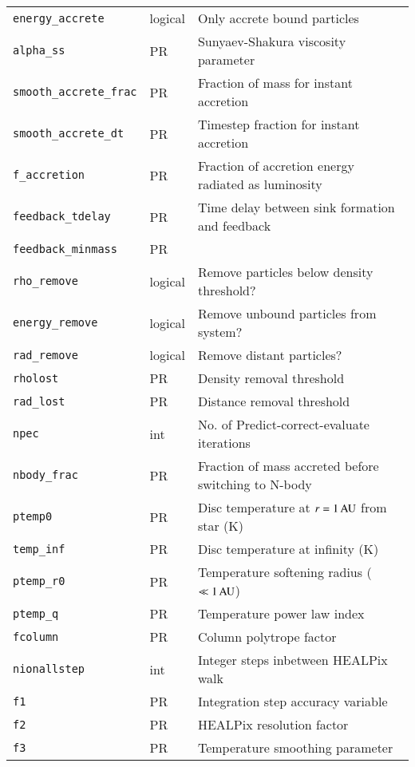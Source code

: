 \documentclass[a4paper]{article}
\newcommand{\var}[1]{\texttt{#1}}
\begin{document}
\begin{center}
\begin{supertabular}{|p{3cm}|p{2cm}|p{8cm}|}
\var{energy\_accrete} & logical & Only accrete bound particles \\
\var{alpha\_ss}       & PR       & Sunyaev-Shakura viscosity parameter \\
\var{smooth\_accrete\_frac} & PR & Fraction of mass for instant accretion \\
\var{smooth\_accrete\_dt}   & PR & Timestep fraction for instant accretion \\
\var{f\_accretion}    & PR      & Fraction of accretion energy radiated as luminosity \\
\var{feedback\_tdelay} & PR     & Time delay between sink formation and feedback\\
\var{feedback\_minmass} & PR    & \\ \hline
\var{rho\_remove}    & logical  & Remove particles below density threshold? \\
\var{energy\_remove} & logical  & Remove unbound particles from system? \\
\var{rad\_remove}    & logical  & Remove distant particles? \\
\var{rholost}        & PR       & Density removal threshold \\
\var{rad\_lost}      & PR       & Distance removal threshold \\ \hline
\var{npec}           & int      & No. of Predict-correct-evaluate iterations \\
\var{nbody\_frac}    & PR       & Fraction of mass accreted before switching to N-body \\ \hline
\var{ptemp0}         & PR       & Disc temperature at $r = 1\,{\rm AU}$ from star (K) \\
\var{temp\_inf}      & PR       & Disc temperature at infinity (K) \\
\var{ptemp\_r0}      & PR       & Temperature softening radius ($\ll 1\,{\rm AU}$) \\
\var{ptemp\_q}       & PR       & Temperature power law index \\
\var{fcolumn}        & PR       & Column polytrope factor \\ \hline
\var{nionallstep}    & int      & Integer steps inbetween HEALPix walk \\
\var{f1}             & PR       & Integration step accuracy variable \\
\var{f2}             & PR       & HEALPix resolution factor \\
\var{f3}             & PR       & Temperature smoothing parameter \\

\end{supertabular}
\end{center}
\end{document}
